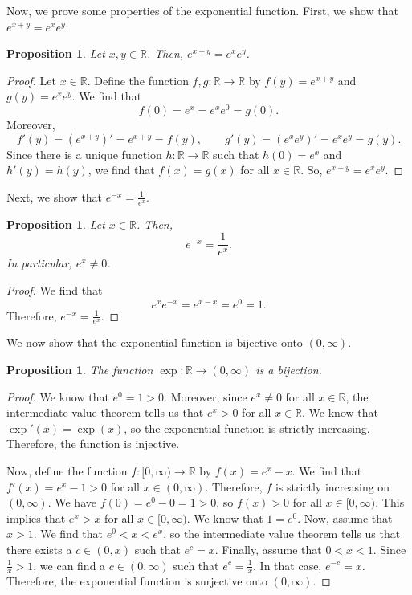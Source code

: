 \documentclass[a4paper, openany]{memoir}
\theoremstyle{definition}
\theoremstyle{plain}
\newtheorem{proposition}[definition]{Proposition}
\begin{document}
Now, we prove some properties of the exponential function. First, we show that $e^{x+y} = e^x e^y$.
\begin{proposition}
Let $x, y \in \mathbb{R}$. Then, $e^{x + y} = e^x e^y$.
\end{proposition}
\begin{proof}
Let $x \in \mathbb{R}$. Define the function $f, g: \mathbb{R} \to \mathbb{R}$ by $f(y) = e^{x + y}$ and $g(y) = e^x e^y$. We find that 
\[f(0) = e^x = e^x e^0 = g(0).\]
Moreover,
\[f'(y) = (e^{x+y})' = e^{x + y} = f(y), \qquad g'(y) = (e^x e^y)' = e^x e^y = g(y).\]
Since there is a unique function $h: \mathbb{R} \to \mathbb{R}$ such that $h(0) = e^x$ and $h'(y) = h(y)$, we find that $f(x) = g(x)$ for all $x \in \mathbb{R}$. So, $e^{x + y} = e^x e^y$.
\end{proof}
\noindent Next, we show that $e^{-x} = \frac{1}{e^x}$.
\begin{proposition}
Let $x \in \mathbb{R}$. Then,
\[e^{-x} = \frac{1}{e^x}.\]
In particular, $e^x \neq 0$.
\end{proposition}
\begin{proof}
We find that
\[e^x e^{-x} = e^{x - x} = e^0 = 1.\]
Therefore, $e^{-x} = \frac{1}{e^x}$.
\end{proof}
\noindent We now show that the exponential function is bijective onto $(0, \infty)$.
\begin{proposition}
The function $\exp: \mathbb{R} \to (0, \infty)$ is a bijection.
\end{proposition}
\begin{proof}
We know that $e^0 = 1 > 0$. Moreover, since $e^x \neq 0$ for all $x \in \mathbb{R}$, the intermediate value theorem tells us that $e^x > 0$ for all $x \in \mathbb{R}$. We know that $\exp'(x) = \exp(x)$, so the exponential function is strictly increasing. Therefore, the function is injective.

\noindent Now, define the function $f: [0, \infty) \to \mathbb{R}$ by $f(x) = e^x - x$. We find that $f'(x) = e^x - 1 > 0$ for all $x \in (0, \infty)$. Therefore, $f$ is strictly increasing on $(0, \infty)$. We have $f(0) = e^0 - 0 = 1 > 0$, so $f(x) > 0$ for all $x \in [0, \infty)$. This implies that $e^x > x$ for all $x \in [0, \infty)$. We know that $1 = e^0$. Now, assume that $x > 1$. We find that $e^0 < x < e^x$, so the intermediate value theorem tells us that there exists a $c \in (0, x)$ such that $e^c = x$. Finally, assume that $0 < x < 1$. Since $\frac{1}{x} > 1$, we can find a $c \in (0, \infty)$ such that $e^c = \frac{1}{x}$. In that case, $e^{-c} = x$. Therefore, the exponential function is surjective onto $(0, \infty)$.
\end{proof}
\end{document}
